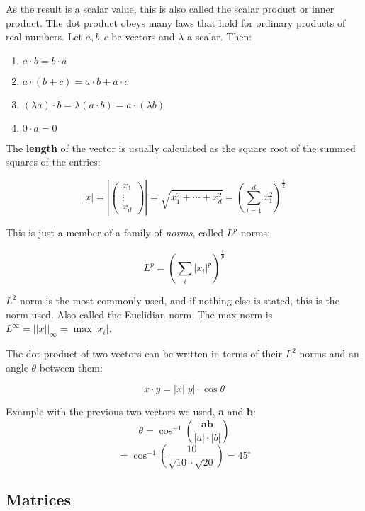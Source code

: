 As the result is a scalar value, this is also called the scalar product or inner product. The dot product obeys many laws that hold for ordinary products of real numbers. Let $a,b,c$ be vectors and \(\lambda\) a scalar. Then:

\begin{enumerate}
	\item $a \cdot b = b \cdot a$
	\item $a \cdot (b + c) = a \cdot b + a \cdot c$
	\item $(\lambda a) \cdot b = \lambda(a \cdot b) = a \cdot (\lambda b)$
	\item \(0 \cdot a = 0\)
\end{enumerate}

The \textbf{length} of the vector is usually calculated as the square root of the summed squares of the entries:

\begin{equation*}
	|x| = \left| \begin{pmatrix}
		x_{1}  \\
		\vdots \\
		x_{d}
	\end{pmatrix} \right|
	=
	\sqrt{x_{1}^{2}+ \cdots + x^{2}_{d}} = \left(  \sum_{i=1}^d x^{2}_{1} \right)^{\frac{1}{2}}
\end{equation*}

This is just a member of a family of \textit{norms}, called $L^{p}$ norms:

\begin{equation*}
	L^{p} = \left(  \sum_{i} |x_{i}|^{p} \right)^{\frac{1}{p}}
\end{equation*}

$L^{2}$ norm is the most commonly used, and if nothing else is stated, this is the norm used. Also called the Euclidian norm. The max norm is $L^{\infty} = \left| \left| x \right| \right|_{\infty} = \max \left| x_{i} \right|$.

The dot product of two vectors can be written in terms of their $L^{2}$ norms and an angle \(\theta\) between them:

\[
	x \cdot y = |x| |y| \cdot \cos \theta
\]

Example with the previous two vectors we used, $\mathbf{a}$ and $\mathbf{b}$:
\[
	\theta = \cos^{-1} \left( \frac{\mathbf{a}\mathbf{b}}{|a| \cdot |b|} \right)
\]
\[
	= \cos^{-1} \left( \frac{10}{\sqrt{10} \cdot \sqrt{20}} \right) = 45^{\circ}
\]

\subsection{Matrices}%
\label{subsec:matrices}

